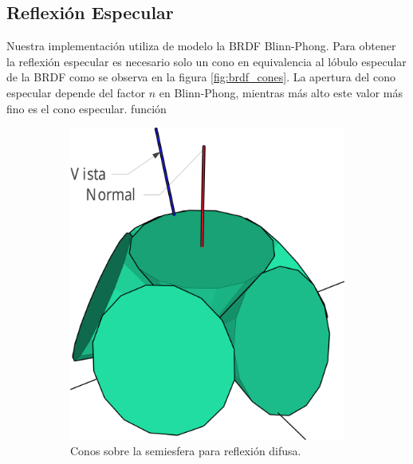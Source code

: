 \subsection{Reflexión Especular}
Nuestra implementación utiliza de modelo la \ac{BRDF} Blinn-Phong. Para obtener la reflexión especular es necesario solo un cono en equivalencia al lóbulo especular de la \ac{BRDF} como se observa en la figura \ref{fig:brdf_cones}. La apertura del cono especular depende del factor $n$ en Blinn-Phong, mientras más alto este valor más fino es el cono especular.
función
\begin{figure}[H]
	\centering
	\begin{subfigure}[t]{.32\linewidth}
		\centering
		\captionsetup{justification=centering}
		\includegraphics[width=\linewidth]{media/diffuse_cones_cropped.pdf}
		\caption*{Conos sobre la semiesfera para reflexión difusa.}
	\end{subfigure}%
	\hspace{0.01\textwidth}
	\begin{subfigure}[t]{.32\linewidth}
		\centering
		\captionsetup{justification=centering}

\end{subfigure}
\end{figure}
